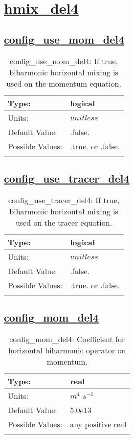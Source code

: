 \section[hmix\_del4]{\hyperref[sec:nm_tab_hmix_del4]{hmix\_del4}}
\label{sec:nm_sec_hmix_del4}
\subsection[config\_use\_mom\_del4]{\hyperref[sec:nm_tab_hmix_del4]{config\_use\_mom\_del4}}
\label{subsec:nm_sec_config_use_mom_del4}
\begin{center}
\begin{longtable}{| p{2.0in} | p{4.0in} |}
    \hline
    Type: & logical \\
    \hline
    Units: & $unitless$ \\
    \hline
    Default Value: & .false. \\
    \hline
    Possible Values: & .true. or .false. \\
    \hline
    \caption{config\_use\_mom\_del4: If true, biharmonic horizontal mixing is used on the momentum equation.}
\end{longtable}
\end{center}
\subsection[config\_use\_tracer\_del4]{\hyperref[sec:nm_tab_hmix_del4]{config\_use\_tracer\_del4}}
\label{subsec:nm_sec_config_use_tracer_del4}
\begin{center}
\begin{longtable}{| p{2.0in} | p{4.0in} |}
    \hline
    Type: & logical \\
    \hline
    Units: & $unitless$ \\
    \hline
    Default Value: & .false. \\
    \hline
    Possible Values: & .true. or .false. \\
    \hline
    \caption{config\_use\_tracer\_del4: If true, biharmonic horizontal mixing is used on the tracer equation.}
\end{longtable}
\end{center}
\subsection[config\_mom\_del4]{\hyperref[sec:nm_tab_hmix_del4]{config\_mom\_del4}}
\label{subsec:nm_sec_config_mom_del4}
\begin{center}
\begin{longtable}{| p{2.0in} | p{4.0in} |}
    \hline
    Type: & real \\
    \hline
    Units: & $m^4$ $s^{-1}$ \\
    \hline
    Default Value: & 5.0e13 \\
    \hline
    Possible Values: & any positive real \\
    \hline
    \caption{config\_mom\_del4: Coefficient for horizontal biharmonic operator on momentum.}
\end{longtable}
\end{center}
